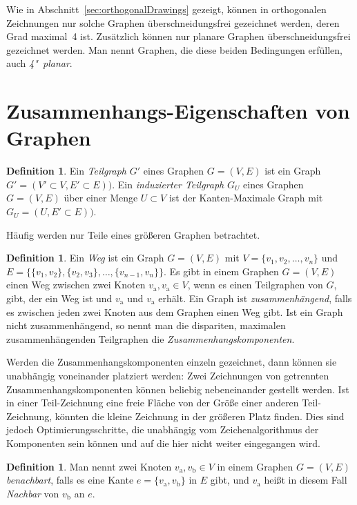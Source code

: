 \documentclass[a4paper]{scrreprt}
\theoremstyle{definition}
\newtheorem{definition}[satz]{Definition}
\begin{document}
Wie in Abschnitt~\ref{sec:orthogonalDrawings} gezeigt, können in orthogonalen Zeichnungen nur solche Graphen überschneidungsfrei gezeichnet werden, deren Grad maximal~4 ist. Zusätzlich können nur planare Graphen überschneidungsfrei gezeichnet werden. Man nennt Graphen, die diese beiden Bedingungen erfüllen, auch \emph{4"~planar}.

\section{Zusammenhangs-Eigenschaften von Graphen}

\begin{definition}
  Ein \emph{Teilgraph} $G'$ eines Graphen $G=(V, E)$ ist ein Graph $G' = (V' \subset V, E' \subset E))$.
  Ein \emph{induzierter Teilgraph} $G_U$ eines Graphen $G=(V, E)$ über einer Menge $U \subset V$ ist der Kanten-Maximale Graph mit $G_U = (U , E' \subset E))$.
\end{definition}

Häufig werden nur Teile eines größeren Graphen betrachtet. %

\begin{definition}
  Ein \emph{Weg} ist ein Graph $G = (V, E)$ mit $V = \{v_1, v_2, \dots, v_n\}$ und $E = \{\{v_1, v_2\}, \{v_2, v_3\}, \dots, \{v_{n-1}, v_{n}\}\}$.
  Es gibt in einem Graphen $G = (V, E)$ einen Weg zwischen zwei Knoten $v_\text{a}, v_\text{a} \in V$, wenn es einen Teilgraphen von $G$, gibt, der ein Weg ist und $v_\text{a}$ und $v_\text{a}$ erhält.
  Ein Graph ist \emph{zusammenhängend}, falls es zwischen jeden zwei Knoten aus dem Graphen einen Weg gibt.
  Ist ein Graph nicht zusammenhängend, so nennt man die dispariten, maximalen zusammenhängenden Teilgraphen die \emph{Zusammenhangskomponenten}.
\end{definition}

Werden die Zusammenhangskomponenten einzeln gezeichnet, dann können sie unabhängig voneinander platziert werden: Zwei Zeichnungen von getrennten Zusammenhangskomponenten können beliebig nebeneinander gestellt werden. Ist in einer Teil-Zeichnung eine freie Fläche von der Größe einer anderen Teil-Zeichnung, könnten die kleine Zeichnung in der größeren Platz finden. Dies sind jedoch Optimierungsschritte, die unabhängig vom Zeichenalgorithmus der Komponenten sein können und auf die hier nicht weiter eingegangen wird.

\begin{definition}
  Man nennt zwei Knoten $v_\text{a}, v_\text{b} \in V$ in einem Graphen $G = (V, E)$ \emph{benachbart}, falls es eine Kante $e = \{v_\text{a}, v_\text{b}\}$ in $E$ gibt, und $v_\text{a}$ heißt in diesem Fall \emph{Nachbar} von $ v_\text{b}$ an $e$. 
\end{definition}
\end{document}
